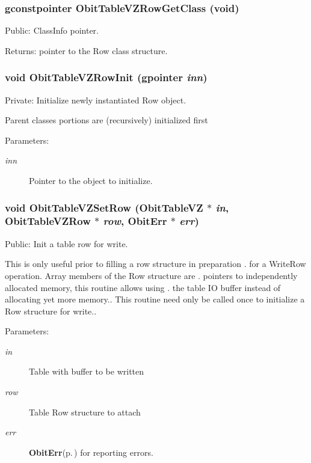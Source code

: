 \subsubsection{\setlength{\rightskip}{0pt plus 5cm}gconstpointer Obit\-Table\-VZRow\-Get\-Class (void)}\label{ObitTableVZ_8c_a15}


Public: Class\-Info pointer. 

\begin{Desc}
\item[Returns:]pointer to the Row class structure. \end{Desc}
\subsubsection{\setlength{\rightskip}{0pt plus 5cm}void Obit\-Table\-VZRow\-Init (gpointer {\em inn})}\label{ObitTableVZ_8c_a6}


Private: Initialize newly instantiated Row object. 

Parent classes portions are (recursively) initialized first \begin{Desc}
\item[Parameters:]
\begin{description}
\item[{\em inn}]Pointer to the object to initialize. \end{description}
\end{Desc}
\subsubsection{\setlength{\rightskip}{0pt plus 5cm}void Obit\-Table\-VZSet\-Row ({\bf Obit\-Table\-VZ} $\ast$ {\em in}, {\bf Obit\-Table\-VZRow} $\ast$ {\em row}, {\bf Obit\-Err} $\ast$ {\em err})}\label{ObitTableVZ_8c_a23}


Public: Init a table row for write. 

This is only useful prior to filling a row structure in preparation . for a Write\-Row operation. Array members of the Row structure are . pointers to independently allocated memory, this routine allows using . the table IO buffer instead of allocating yet more memory.. This routine need only be called once to initialize a Row structure for write.. \begin{Desc}
\item[Parameters:]
\begin{description}
\item[{\em in}]Table with buffer to be written \item[{\em row}]Table Row structure to attach \item[{\em err}]{\bf Obit\-Err}{\rm (p.\,\pageref{structObitErr})} for reporting errors. \end{description}
\end{Desc}
